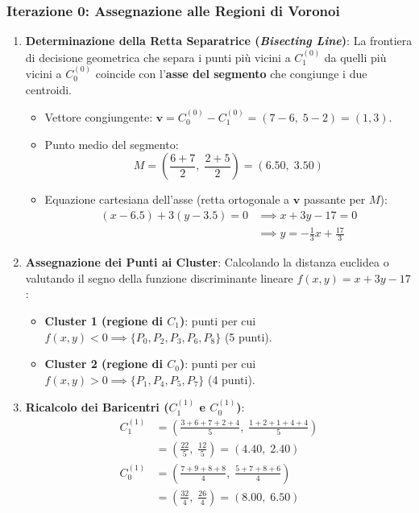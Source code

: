 \subsubsection{Iterazione 0: Assegnazione alle Regioni di Voronoi}
\begin{enumerate}[label=\textbf{\arabic*.}]
    \item \textbf{Determinazione della Retta Separatrice (\textit{Bisecting Line})}:
    La frontiera di decisione geometrica che separa i punti più vicini a $C_1^{(0)}$ da quelli più vicini a $C_0^{(0)}$ coincide con l'\textbf{asse del segmento} che congiunge i due centroidi.
    \begin{itemize}
        \item Vettore congiungente: $\mathbf{v} = C_0^{(0)} - C_1^{(0)} = (7 - 6, \; 5 - 2) = (1, 3)$.
        \item Punto medio del segmento:
        \begin{equation}
        M = \left( \frac{6 + 7}{2}, \; \frac{2 + 5}{2} \right) = (6.50, \; 3.50)
        \end{equation}
        \item Equazione cartesiana dell'asse (retta ortogonale a $\mathbf{v}$ passante per $M$):
        \begin{align}
        (x - 6.5) + 3(y - 3.5) = 0 &\implies x + 3y - 17 = 0 \nonumber \\
        &\implies y = -\frac{1}{3}x + \frac{17}{3}
        \end{align}
    \end{itemize}

    \item \textbf{Assegnazione dei Punti ai Cluster}:
    Calcolando la distanza euclidea o valutando il segno della funzione discriminante lineare $f(x, y) = x + 3y - 17$:
    \begin{itemize}
        \item \textbf{Cluster 1 (regione di $C_1$)}: punti per cui $f(x, y) < 0 \implies \{P_0, P_2, P_3, P_6, P_8\}$ (5 punti).
        \item \textbf{Cluster 2 (regione di $C_0$)}: punti per cui $f(x, y) > 0 \implies \{P_1, P_4, P_5, P_7\}$ (4 punti).
    \end{itemize}

    \item \textbf{Ricalcolo dei Baricentri ($C_1^{(1)}$ e $C_0^{(1)}$)}:
    \begin{align}
    C_1^{(1)} &= \left( \frac{3 + 6 + 7 + 2 + 4}{5}, \; \frac{1 + 2 + 1 + 4 + 4}{5} \right) \nonumber \\
              &= \left( \frac{22}{5}, \; \frac{12}{5} \right) = (4.40, \; 2.40) \\[4pt]
    C_0^{(1)} &= \left( \frac{7 + 9 + 8 + 8}{4}, \; \frac{5 + 7 + 8 + 6}{4} \right) \nonumber \\
              &= \left( \frac{32}{4}, \; \frac{26}{4} \right) = (8.00, \; 6.50)
    \end{align}
\end{enumerate}

